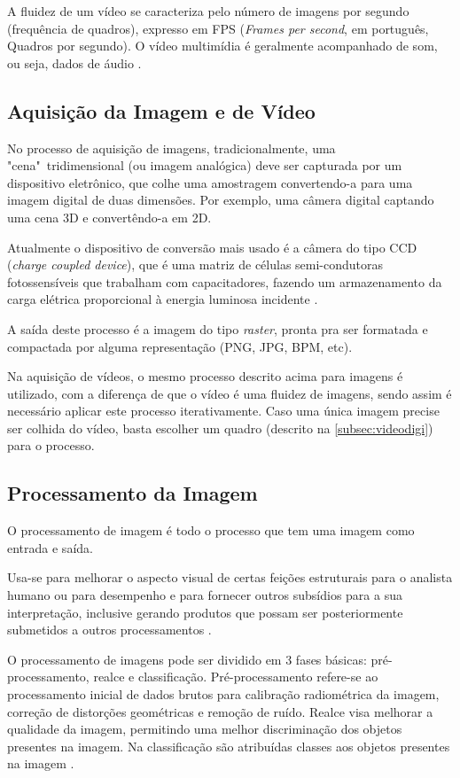  A fluidez de um vídeo se caracteriza pelo número de imagens por segundo (frequência de quadros), expresso em FPS (\textit{Frames per second}, em português, Quadros por segundo). O vídeo multimídia é geralmente acompanhado de som, ou seja, dados de áudio \cite{ccm_video_digi}.

\subsection{Aquisição da Imagem e de Vídeo}\label{subsec:aquisicao_video}

No processo de aquisição de imagens, tradicionalmente, uma "cena"\ tridimensional (ou imagem analógica) deve ser capturada por um dispositivo eletrônico, que colhe uma amostragem convertendo-a para uma imagem digital de duas dimensões. Por exemplo, uma câmera digital captando uma cena 3D e convertêndo-a em 2D.

Atualmente o dispositivo de conversão mais usado  é a câmera do tipo CCD (\textit{charge coupled device}), que é uma matriz de células semi-condutoras fotossensíveis que trabalham com capacitadores, fazendo um armazenamento da carga elétrica proporcional à energia luminosa incidente \cite{gonzalez_woods}.

A saída deste processo é a imagem do tipo \textit{raster}, pronta pra ser formatada e compactada por alguma representação (PNG, JPG, BPM, etc). 


Na aquisição de vídeos, o mesmo processo descrito acima para imagens é utilizado, com a diferença de que o vídeo é uma fluidez de imagens, sendo assim é necessário aplicar este processo iterativamente. Caso uma única imagem precise ser colhida do vídeo, basta escolher um quadro (descrito na \autoref{subsec:videodigi}) para o processo.

\subsection{Processamento da Imagem}\label{subsec:processamento}

O processamento de imagem é todo o processo que tem uma imagem como entrada e saída.

Usa-se para melhorar o aspecto visual de certas feições estruturais para o analista humano ou para desempenho e para fornecer outros subsídios para a sua interpretação, inclusive gerando produtos que possam ser posteriormente submetidos a outros processamentos \cite{inpe_proc_img}.

O processamento de imagens pode ser dividido em 3 fases básicas: pré-processamento, realce e classificação.
Pré-processamento refere-se ao processamento inicial de dados brutos para calibração radiométrica da imagem, correção de distorções geométricas e remoção de ruído.
Realce visa melhorar a qualidade da imagem, permitindo uma melhor discriminação dos objetos presentes na imagem. Na classificação são atribuídas classes aos objetos presentes na imagem \cite{inpe_proc_img}.


